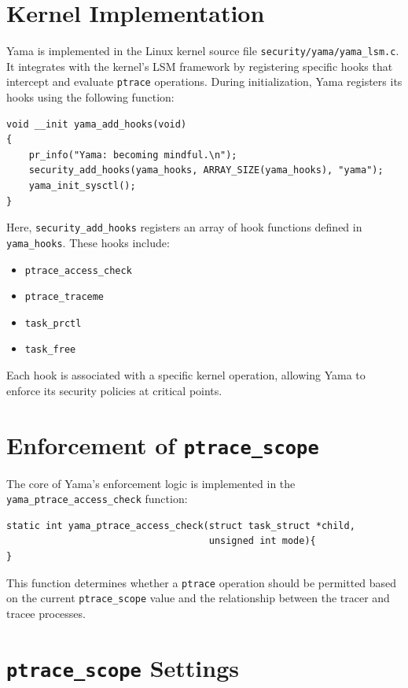 \documentclass[12pt]{report}
\begin{document}
\begin{doublespace}
\section{Kernel Implementation}

Yama is implemented in the Linux kernel source file \texttt{security/yama/yama\_lsm.c}. It integrates with the kernel's LSM framework by registering specific hooks that intercept and evaluate \texttt{ptrace} operations. During initialization, Yama registers its hooks using the following function:

\begin{verbatim}
void __init yama_add_hooks(void)
{
    pr_info("Yama: becoming mindful.\n");
    security_add_hooks(yama_hooks, ARRAY_SIZE(yama_hooks), "yama");
    yama_init_sysctl();
}
\end{verbatim}

Here, \texttt{security\_add\_hooks} registers an array of hook functions defined in \texttt{yama\_hooks}. These hooks include:

\begin{itemize}
    \item \texttt{ptrace\_access\_check}
    \item \texttt{ptrace\_traceme}
    \item \texttt{task\_prctl}
    \item \texttt{task\_free}
\end{itemize}

Each hook is associated with a specific kernel operation, allowing Yama to enforce its security policies at critical points.

\section{Enforcement of \texttt{ptrace\_scope}}

The core of Yama’s enforcement logic is implemented in the \texttt{yama\_ptrace\_access\_check} function:

\begin{verbatim}
static int yama_ptrace_access_check(struct task_struct *child, 
									unsigned int mode){
}
\end{verbatim}

This function determines whether a \texttt{ptrace} operation should be permitted based on the current \texttt{ptrace\_scope} value and the relationship between the tracer and tracee processes.

\section{\texttt{ptrace\_scope} Settings}


\end{doublespace}
\end{document}
